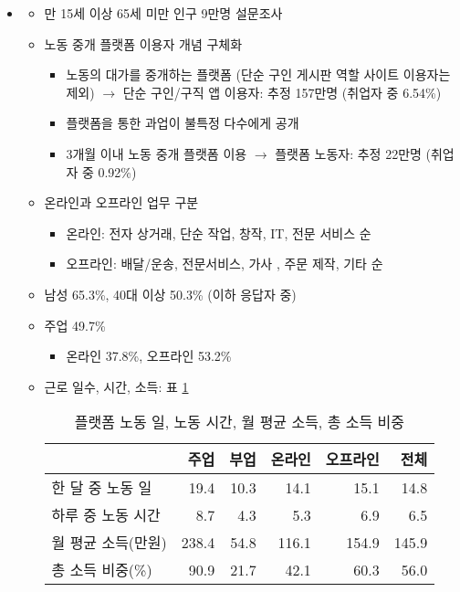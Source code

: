 \begin{itemize}
\pagebreak	
	
	
\item \cite{jangjiyeon:2020ab}
	\begin{itemize}
	\item 만 15세 이상 65세 미만 인구 9만명 설문조사
	\item 노동 중개 플랫폼 이용자 개념 구체화 
		\begin{itemize}
		\item 노동의 대가를 중개하는 플랫폼 (단순 구인 게시판 역할 사이트 이용자는 제외) $\rightarrow$ 단순 구인/구직 앱 이용자: 추정 157만명 (취업자 중 6.54\%)
		\item 플랫폼을 통한 과업이 불특정 다수에게 공개
		\item 3개월 이내 노동 중개 플랫폼 이용 $\rightarrow$ 플랫폼 노동자: 추정 22만명 (취업자 중 0.92\%)
		\end{itemize}
	\item 온라인과 오프라인 업무 구분
		\begin{itemize}
		\item 온라인: 전자 상거래, 단순 작업, 창작, IT, 전문 서비스 순
		\item 오프라인: 배달/운송, 전문서비스, 가사 , 주문 제작, 기타 순
		\end{itemize}
	\item 남성 65.3\%, 40대 이상 50.3\% (이하 응답자 중)
	\item 주업 49.7\%
		\begin{itemize}
		\item 온라인 37.8\%, 오프라인 53.2\%
		\end{itemize}
	\item 근로 일수, 시간, 소득: 표 \ref{tab:jang2020income}		
		\begin{table}[htp]
		\caption{플랫폼 노동 일, 노동 시간, 월 평균 소득, 총 소득 비중}
		\begin{center}
		\begin{tabular}{lrrrrr}
		\toprule
		& 주업 & 부업 & 온라인 & 오프라인 & 전체 \\
		\midrule
		한 달 중 노동 일 & 19.4 & 10.3 & 14.1 & 15.1 & 14.8 \\
		하루 중 노동 시간 & 8.7 & 4.3 & 5.3 & 6.9 & 6.5 \\
		월 평균 소득(만원) & 238.4 & 54.8 & 116.1 & 154.9 & 145.9 \\
		총 소득 비중(\%) & 90.9 & 21.7 & 42.1 & 60.3 & 56.0 \\
		\bottomrule
		\end{tabular}
		\end{center}
		\label{tab:jang2020income}
		\end{table}%
		

\end{itemize}
\end{itemize}
